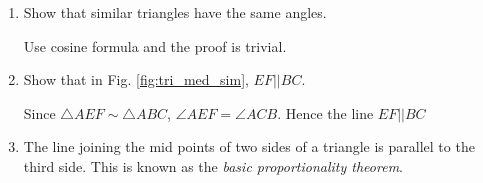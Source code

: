 \begin{enumerate}[label=\arabic*.,ref=\thesubsection.\theenumi]
\item
	Show that similar triangles have the same angles.

\solution Use cosine formula and the proof is trivial.
\item	Show that in Fig. \ref{fig:tri_med_sim}, $EF || BC$.

\solution Since $\triangle AEF \sim \triangle ABC$, $\angle AEF = \angle ACB$.  Hence the line $EF||BC$
%
\item The line joining the mid points of two sides of a triangle is parallel to the third side.  This is known as the {\em basic proportionality theorem}.
\label{them:tri_med_bpt}
\end{enumerate}
